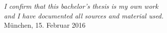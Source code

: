 \thispagestyle{empty}

\vspace*{\fill}
\begin{flushright}
\noindent \textit{I confirm that this bachelor's thesis is my own work \\ and I have documented all sources and material used.\\[\baselineskip]}
M{\"u}nchen, 15. Februar 2016 \\[3.5\baselineskip]
\underline{\hspace{6.5cm}}
\end{flushright}
